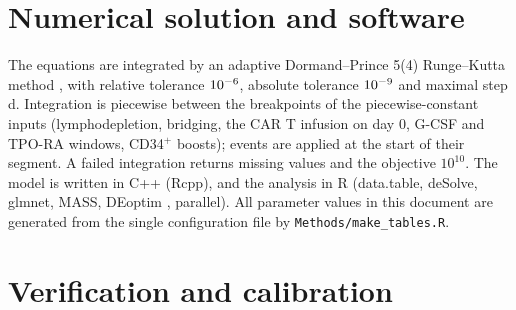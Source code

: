 \documentclass[11pt]{article}
\begin{document}
\section{Numerical solution and software}
The equations are integrated by an adaptive Dormand--Prince 5(4) Runge--Kutta method \citep{dormand1980}, with relative tolerance $10^{-6}$, absolute tolerance $10^{-9}$ and maximal step \valHmax{} d. Integration is piecewise between the breakpoints of the piecewise-constant inputs (lymphodepletion, bridging, the CAR T infusion on day 0, G-CSF and TPO-RA windows, CD34$^+$ boosts); events are applied at the start of their segment. A failed integration returns missing values and the objective $10^{10}$. The model is written in C++ (Rcpp), and the analysis in R \valRVersion{} (data.table, deSolve, glmnet, MASS, DEoptim \valDEoptim, parallel). All parameter values in this document are generated from the single configuration file by \texttt{Methods/make\_tables.R}.

\section{Verification and calibration}\label{sec:calibration}
\end{document}
